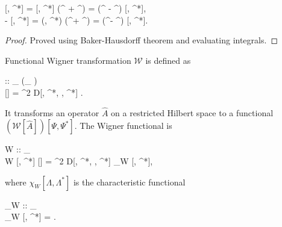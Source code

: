 \begin{lemma}
\label{lmm:func-wigner:displacement-derivatives}
	\begin{eqn*}
		\frac{\delta}{\delta \Lambda^\prime} [\Lambda, \Lambda^*]
		= [\Lambda, \Lambda^*] (\Psiop^{\prime\dagger} +  \Lambda^{\prime*})
		= (\Psiop^{\prime\dagger} -  \Lambda^{\prime*}) [\Lambda, \Lambda^*], \\
		-\frac{\delta}{\delta \Lambda^{\prime*}} [\Lambda, \Lambda^*]
		= (\Lambda, \Lambda^*) (\Psiop^\prime +  \Lambda^\prime)
		= (\Psiop^\prime -  \Lambda^\prime) [\Lambda, \Lambda^*].
	\end{eqn*}
\end{lemma}
\begin{proof}
Proved using Baker-Hausdorff theorem and evaluating integrals.
\end{proof}

\begin{definition}
\label{eqn:func-wigner:w-transformation}
	Functional Wigner transformation $\mathcal{W}$ is defined as
	\begin{eqn*}
		 :: _{\restbasis} \rightarrow (_{\restbasis} \rightarrow \mathbb{C}) \\
		[\hat{A}]
		=  \int \delta^2 \Lambda
			D[\Lambda, \Lambda^*, \Psi, \Psi^*]
			\Trace{ \hat{A} \hat{D}[\Lambda, \Lambda^*] }.
	\end{eqn*}
	It transforms an operator $\hat{A}$ on a restricted Hilbert space to a functional $(\mathcal{W}[\hat{A}])[\Psi, \Psi^*]$.
	The Wigner functional is
	\begin{eqn*}
		W :: _{\restbasis} \rightarrow \mathbb{C} \\
		W [\Psi, \Psi^*]
		\equiv {}[\hat{\rho}]
		=  \int \delta^2 \Lambda
			D[\Lambda, \Lambda^*, \Psi, \Psi^*]
			\chi_W [\Lambda, \Lambda^*],
	\end{eqn*}
	where $\chi_W [\Lambda, \Lambda^*]$ is the characteristic functional
	\begin{eqn*}
		\chi_W :: _{\restbasis} \rightarrow \mathbb{R} \\
		\chi_W [\Lambda, \Lambda^*]
		= \Trace{ \hat{\rho} \hat{D}[\Lambda, \Lambda^*] }.
	\end{eqn*}
\end{definition}

